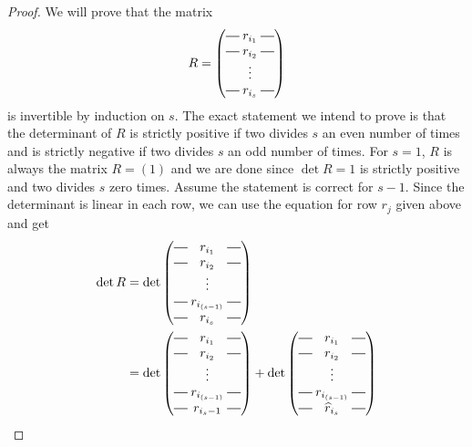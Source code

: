\begin{proof}
  We will prove that the matrix
  \[ R = 
  \begin{pmatrix}
    \matrow{r_{i_1}} \\
    \matrow{r_{i_2}} \\
    & \hspace{-0.75em} \vdots & \\
    \matrow{r_{i_s}}
  \end{pmatrix}
  \]
  is invertible by induction on $s$. The exact statement we intend to
  prove is that the determinant of $R$ is strictly positive if two
  divides $s$ an even number of times and is strictly negative if
  two divides $s$ an odd number of times.
  For $s = 1$, $R$ is always the matrix $R = \left( 1 \right)$ and we
  are done since $\det R = 1$ is strictly positive and two divides $s$
  zero times.
  Assume the statement is correct for $s-1$. Since the determinant is
  linear in each row, we can use the equation for row $r_j$ given
  above and get
  \begin{align*}
    \det{R} &= 
              \det\begin{pmatrix}
                \matrow{r_{i_1}} \\
                \matrow{r_{i_2}} \\
                & \hspace{-0.75em} \vdots & \\
                \matrow{r_{i_{(s-1)}}} \\
                \matrow{r_{i_s}}
              \end{pmatrix} \\
            &= 
              \det\begin{pmatrix}
                \matrow{r_{i_1}} \\
                \matrow{r_{i_2}} \\
                & \hspace{-0.75em} \vdots & \\
                \matrow{r_{i_{(s-1)}}} \\
                \matrow{r_{i_s-1}}
              \end{pmatrix}+
    \det\begin{pmatrix}
      \matrow{r_{i_1}} \\
      \matrow{r_{i_2}} \\
      & \hspace{-0.75em} \vdots & \\
      \matrow{r_{i_{(s-1)}}} \\
      \matrow{\widehat{r}_{i_s}}

\end{pmatrix}
\end{align*}
\end{proof}
